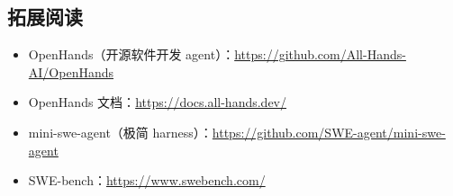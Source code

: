 \documentclass[a4paper]{article}
\begin{document}
\subsection{拓展阅读}

\begin{itemize}
\item OpenHands（开源软件开发 agent）：\url{https://github.com/All-Hands-AI/OpenHands}
\item OpenHands 文档：\url{https://docs.all-hands.dev/}
\item mini-swe-agent（极简 harness）：\url{https://github.com/SWE-agent/mini-swe-agent}
\item SWE-bench：\url{https://www.swebench.com/}
\end{itemize}

\end{document}

